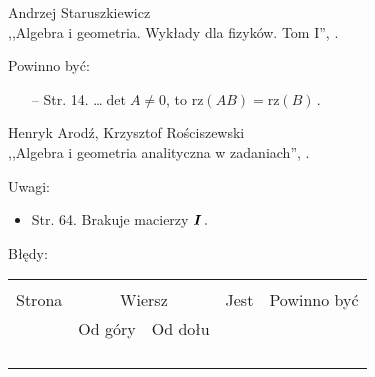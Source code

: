 \documentclass[a4paper,11pt]{article}
\begin{document}
\begin{center}
  Andrzej Staruszkiewicz \\
  ,,Algebra i geometria. Wykłady dla fizyków. Tom I'', \cite{ASAG}.
\end{center}


Powinno być:
\begin{itemize}
\item[--] Str. 14. \ldots $\det A \neq 0$, to
  $\textrm{rz} ( AB ) = \textrm{rz} ( B ) \, .$
\end{itemize}


\begin{center}
  Henryk Arodź, Krzysztof Rościszewski\\
  ,,Algebra i geometria analityczna w zadaniach'', \cite{AR}.
\end{center}


Uwagi:
\begin{itemize}
\item Str. 64. Brakuje macierzy $\boldsymbol{I} \, .$
\end{itemize}

Błędy:\\
\begin{tabular}{|c|c|c|c|c|}
  \hline
  & \multicolumn{2}{c|}{} & & \\
  Strona & \multicolumn{2}{c|}{Wiersz} & Jest
                            & Powinno być \\ \cline{2-3}
  & Od góry & Od dołu & & \\ 
  \hline
  & & & & \\
  & & & & \\
  & & & & \\
  & & & & \\
  \hline
\end{tabular}
\end{document}
